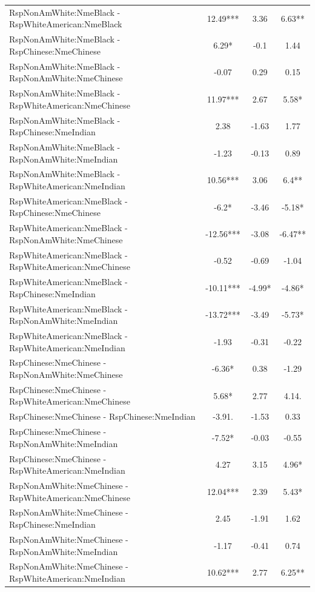 \documentclass[]{report}
\begin{document}
\begin{table}
{\begin{tabular}[t]{lccc}
		RspNonAmWhite:NmeBlack - RspWhiteAmerican:NmeBlack & 12.49*** & 3.36 & 6.63** \\ 
		RspNonAmWhite:NmeBlack - RspChinese:NmeChinese & 6.29* & -0.1 & 1.44 \\ 
		RspNonAmWhite:NmeBlack - RspNonAmWhite:NmeChinese & -0.07 & 0.29 & 0.15 \\ 
		RspNonAmWhite:NmeBlack - RspWhiteAmerican:NmeChinese & 11.97*** & 2.67 & 5.58* \\ 
		RspNonAmWhite:NmeBlack - RspChinese:NmeIndian & 2.38 & -1.63 & 1.77 \\ 
		RspNonAmWhite:NmeBlack - RspNonAmWhite:NmeIndian & -1.23 & -0.13 & 0.89 \\ 
		RspNonAmWhite:NmeBlack - RspWhiteAmerican:NmeIndian & 10.56*** & 3.06 & 6.4** \\ 
		RspWhiteAmerican:NmeBlack - RspChinese:NmeChinese & -6.2* & -3.46 & -5.18* \\ 
		RspWhiteAmerican:NmeBlack - RspNonAmWhite:NmeChinese & -12.56*** & -3.08 & -6.47** \\ 
		RspWhiteAmerican:NmeBlack - RspWhiteAmerican:NmeChinese & -0.52 & -0.69 & -1.04 \\ 
		RspWhiteAmerican:NmeBlack - RspChinese:NmeIndian & -10.11*** & -4.99* & -4.86* \\ 
		RspWhiteAmerican:NmeBlack - RspNonAmWhite:NmeIndian & -13.72*** & -3.49 & -5.73* \\ 
		RspWhiteAmerican:NmeBlack - RspWhiteAmerican:NmeIndian & -1.93 & -0.31 & -0.22 \\ 
		RspChinese:NmeChinese - RspNonAmWhite:NmeChinese & -6.36* & 0.38 & -1.29 \\ 
		RspChinese:NmeChinese - RspWhiteAmerican:NmeChinese & 5.68* & 2.77 & 4.14. \\ 
		RspChinese:NmeChinese - RspChinese:NmeIndian & -3.91. & -1.53 & 0.33 \\ 
		RspChinese:NmeChinese - RspNonAmWhite:NmeIndian & -7.52* & -0.03 & -0.55 \\ 
		RspChinese:NmeChinese - RspWhiteAmerican:NmeIndian & 4.27 & 3.15 & 4.96* \\ 
		RspNonAmWhite:NmeChinese - RspWhiteAmerican:NmeChinese & 12.04*** & 2.39 & 5.43* \\ 
		RspNonAmWhite:NmeChinese - RspChinese:NmeIndian & 2.45 & -1.91 & 1.62 \\ 
		RspNonAmWhite:NmeChinese - RspNonAmWhite:NmeIndian & -1.17 & -0.41 & 0.74 \\ 
		RspNonAmWhite:NmeChinese - RspWhiteAmerican:NmeIndian & 10.62*** & 2.77 & 6.25** \\ 

\end{tabular}}
\end{table}
\end{document}
